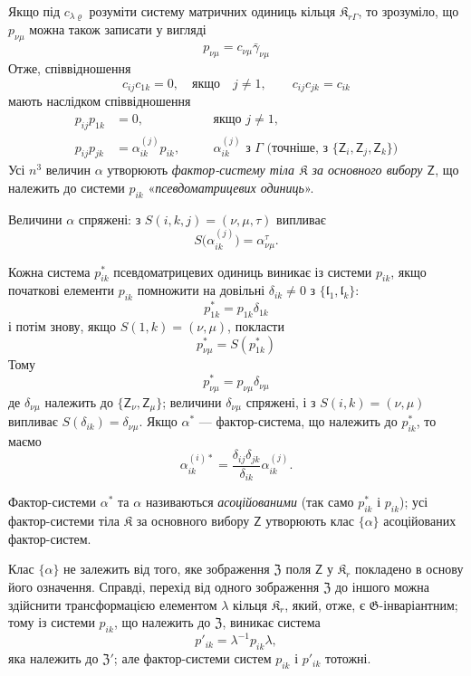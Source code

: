 \documentclass[11pt]{article}
\begin{document}
Якщо під \(c_{\lambda\varrho}\) розуміти систему матричних одиниць кільця \(\mathfrak K_{r\Gamma}\), то зрозуміло, що \(p_{\nu\mu}\) можна також записати у вигляді
\[
p_{\nu\mu}=c_{\nu\mu}\bar\gamma_{\nu\mu}
\]
Отже, співвідношення
\[
c_{ij}c_{1k}=0,\quad\text{якщо}\quad j\ne1,
\qquad
c_{ij}c_{jk}=c_{ik}
\]
мають наслідком співвідношення
\[
\begin{aligned}
p_{ij}p_{1k}&=0,\quad &&\text{якщо }j\ne1,\\
p_{ij}p_{jk}&=\alpha_{ik}^{(j)}p_{ik},\quad
&&\alpha_{ik}^{(j)}\text{ з }\Gamma\text{ (точніше, з }\{\mathsf{Z}_i,\mathsf{Z}_j,\mathsf{Z}_k\}\text{)}
\end{aligned}
\]
Усі \(n^3\) величин \(\alpha\) утворюють \emph{фактор-систему тіла \(\mathfrak K\) за основного вибору \(\mathsf{Z}\)}, що належить до системи \(p_{ik}\) «\emph{псевдоматрицевих одиниць}».

Величини \(\alpha\) спряжені: з \(S(i,k,j)=(\nu,\mu,\tau)\) випливає
\[
S\bigl(\alpha_{ik}^{(j)}\bigr)=\alpha_{\nu\mu}^{\tau}.
\]

Кожна система \(p_{ik}^*\) псевдоматрицевих одиниць виникає із системи \(p_{ik}\), якщо початкові елементи \(p_{ik}\) помножити на довільні \(\delta_{ik}\ne0\) з \(\{\mathfrak l_1,\mathfrak l_k\}\):
\[
p_{1k}^*=p_{1k}\delta_{1k}
\]
і потім знову, якщо \(S(1,k)=(\nu,\mu)\), покласти
\[
p_{\nu\mu}^*=S(p_{1k}^*)
\]
Тому
\[
p_{\nu\mu}^*=p_{\nu\mu}\delta_{\nu\mu}
\]
де \(\delta_{\nu\mu}\) належить до \(\{\mathsf{Z}_\nu,\mathsf{Z}_\mu\}\); величини \(\delta_{\nu\mu}\) спряжені, і з \(S(i,k)=(\nu,\mu)\) випливає \(S(\delta_{ik})=\delta_{\nu\mu}\). Якщо \(\alpha^*\) --- фактор-система, що належить до \(p_{ik}^*\), то маємо
\[
\alpha_{ik}^{(i)*}=\frac{\delta_{ij}\delta_{jk}}{\delta_{ik}}\alpha_{ik}^{(j)}.
\]

Фактор-системи \(\alpha^*\) та \(\alpha\) називаються \emph{асоційованими} (так само \(p_{ik}^*\) і \(p_{ik}\)); усі фактор-системи тіла \(\mathfrak K\) за основного вибору \(\mathsf{Z}\) утворюють клас \(\{\alpha\}\) асоційованих фактор-систем.

Клас \(\{\alpha\}\) не залежить від того, яке зображення \(\mathfrak Z\) поля \(\mathsf{Z}\) у \(\mathfrak K_r\) покладено в основу його означення. Справді, перехід від одного зображення \(\mathfrak Z\) до іншого можна здійснити трансформацією елементом \(\lambda\) кільця \(\mathfrak K_r\), який, отже, є \(\mathfrak G\)-інваріантним; тому із системи \(p_{ik}\), що належить до \(\mathfrak Z\), виникає система
\[
p'_{ik}=\lambda^{-1}p_{ik}\lambda,
\]
яка належить до \(\mathfrak Z'\); але фактор-системи систем \(p_{ik}\) і \(p'_{ik}\) тотожні.
\end{document}

